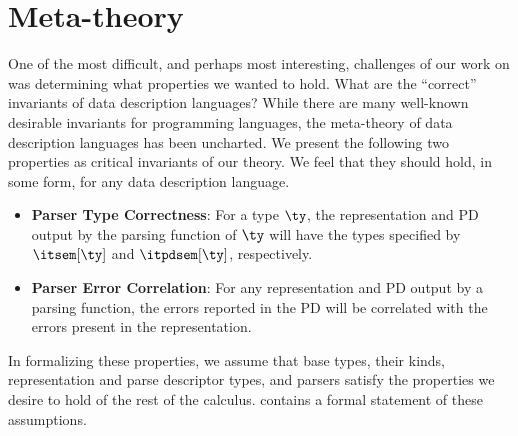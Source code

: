 \section{Meta-theory}
\label{sec:meta-theory}


One of the most difficult, and perhaps most interesting, challenges of our
work on \ddc{} was determining what
properties we wanted to hold. What are the ``correct''
invariants of data description languages? While there are many
well-known desirable invariants for programming languages, the
meta-theory of data description languages has been
uncharted.
%
We present the following two properties as critical invariants of
our theory. We feel that they should hold, in some form, for any data
description language.
\begin{itemize}
\item {\bf Parser Type Correctness}: For a \ddc{} type $\ty$, the
  representation and PD output by the parsing function of $\ty$ will
  have the types specified by $\itsem[\ty]$ and
  $\itpdsem[\ty]$, respectively.
  
\item {\bf Parser Error Correlation}: For any representation and PD output by a
  parsing function, the errors reported in the PD
  will be correlated with the errors present in the representation.
\end{itemize}
%
In formalizing these properties, we assume that \ddc{} base types, their kinds, representation and parse descriptor types, and parsers satisfy the properties we desire to hold of the rest of the calculus.  
 contains a formal statement of these assumptions.


